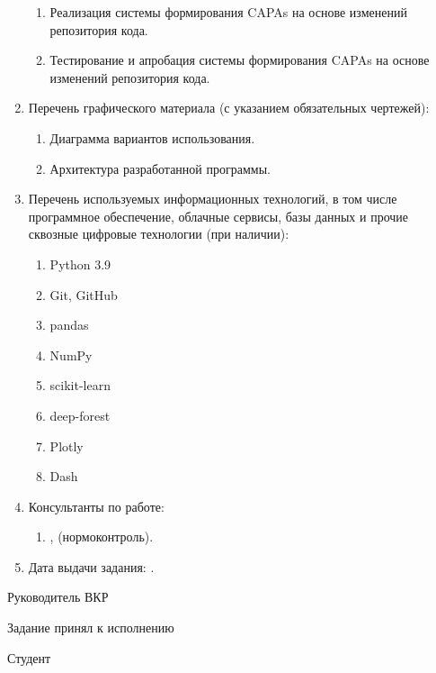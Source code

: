 \begin{enumerate}[1.]
\begin{enumerate}[label=\theenumi\arabic*.]
\item Реализация системы формирования CAPAs на основе изменений репозитория кода.
\item Тестирование и апробация системы формирования CAPAs на основе изменений репозитория кода.
\end{enumerate}
\item Перечень графического материала (с указанием обязательных чертежей): 
\begin{enumerate}[label=\theenumi\arabic*.]
\item Диаграмма вариантов использования.
\item Архитектура разработанной программы.
\end{enumerate}
\item Перечень используемых информационных технологий, в том числе программное обеспечение, облачные сервисы, базы данных и прочие сквозные цифровые технологии (при наличии):
\begin{enumerate}[label=\theenumi\arabic*.]
	\item Python 3.9
	\item  Git, GitHub
	\item  pandas
	\item NumPy
	\item scikit-learn
	\item deep-forest
	\item Plotly
	\item Dash
\end{enumerate}

\item Консультанты по работе:
\begin{enumerate}[label=\theenumi\arabic*.] 
\item {\emakefirstuc{\ConsultantNormDegree}, \ConsultantNorm{} (нормоконтроль).} %
\end{enumerate}
\item Дата выдачи задания: {\thesisStartDate.}
\end{enumerate}

\intervalS%

Руководитель ВКР {\hspace*{0.1\textheight} \Supervisor}


Задание принял к исполнению {\thesisStartDate}

\intervalS%

Студент {\hspace*{0.1\textheight}  \Author}



